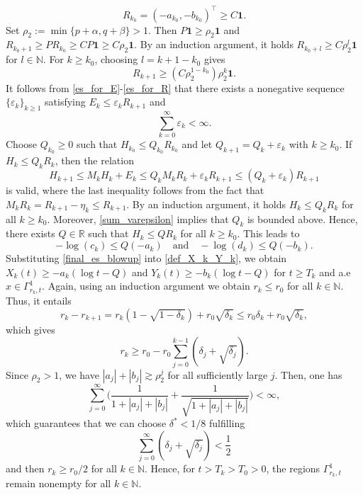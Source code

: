 \documentclass[11pt,reqno]{amsart}
\begin{document}
	\[
	R_{k_0}=(-a_{k_0},-b_{k_0})^{\top}\geq C\boldsymbol{1}.
	\]
	Set $\rho_2:= \min\{p+\alpha,q+\beta\}>1$. Then $P\boldsymbol{1}\geq \rho_2\boldsymbol{1}$ and $R_{k_0+1}\geq PR_{k_0}\geq CP\boldsymbol{1}\geq C\rho_2\boldsymbol{1}$. By an induction argument, it holds $R_{k_0+l}\geq C\rho^l_2\boldsymbol{1}$ for $l\in\mathbb{N}$. For $k\geq k_0$, choosing $l=k+1-k_0$ gives
	\begin{equation}\label{es_for_R}
		R_{k+1}\geq (C\rho^{1-k_0}_2)\rho^k_2\boldsymbol{1}.
	\end{equation}
	It follows from \eqref{es_for_E}-\eqref{es_for_R} that there exists a nonegative sequence $\{\varepsilon_k\}_{k\geq1}$ satisfying $E_k\leq\varepsilon_kR_{k+1}$ and
	\begin{equation}\label{sum_varepsilon}
		\sum_{k=0}^{\infty}\varepsilon_{k}<\infty.
	\end{equation}
	Choose $Q_{k_0}\geq0$ such that $H_{k_0}\leq Q_{k_0}R_{k_0}$ and let $Q_{k+1}=Q_{k}+\varepsilon_k$ with $k\geq k_0$. If $H_{k}\leq Q_{k} R_{k}$, then the relation
	\[
	H_{k+1}\leq M_{k}H_{k}+E_{k}\leq Q_kM_kR_k+\varepsilon_kR_{k+1}\leq (Q_{k}+\varepsilon_k)R_{k+1}
	\]
	is valid, where the last inequality follows from the fact that $M_{k}R_{k}=R_{k+1}-\eta_{k}\leq R_{k+1}$. By an induction argument, it holds $H_k\leq Q_kR_k$ for all $k\geq k_0$. Moreover, \eqref{sum_varepsilon} implies that $Q_k$ is bounded above. Hence, there exists $Q\in \mathbb{R}$ such that $H_k\leq QR_k$ for all $k\geq k_0$. This leads to
	\begin{equation}\label{final_es_blowup}
		-\log(c_k)\leq Q(-a_k)\quad\text{and}\quad-\log(d_k)\leq Q(-b_k).
	\end{equation}
	Substituting \eqref{final_es_blowup} into \eqref{def_X_k_Y_k}, we obtain $X_k(t)\geq-a_k(\log t-Q)$ and $Y_k(t)\geq-b_k(\log t-Q)$ for $t\geq T_k$ and a.e $x\in\Gamma^1_{r_k,t}$. Again, using an induction argument we obtain $r_k\leq r_0$ for all $k\in\mathbb{N}$. Thus, it entails
	\[
	r_k-r_{k+1}=r_k(1-\sqrt{1-\delta_k})+r_0\sqrt{\delta_k}\leq r_0\delta_k+r_0\sqrt{\delta_k},
	\]
	which gives
	\[
	r_k\geq r_0-r_0\sum_{j=0}^{k-1}(\delta_j+\sqrt{\delta_j}).
	\]
	Since $\rho_2>1$, we have $|a_j|+|b_j|\gtrsim \rho_2^j$ for all sufficiently large $j$. Then, one has
	\[
	\sum_{j=0}^{\infty}\bigg(\frac{1}{1+|a_j|+|b_j|}+\frac{1}{\sqrt{1+|a_j|+|b_j|}}\bigg)<\infty,
	\]
	which guarantees that we can choose $\delta^*<1/8$ fulfilling
	\[
	\sum_{j=0}^{\infty}(\delta_j+\sqrt{\delta_j})<\frac{1}{2}
	\]
	and then $r_k\geq r_0/2$ for all $k\in\mathbb{N}$. Hence, for $t>T_k>T_0>0$, the regions $\Gamma^1_{r_k,t}$ remain nonempty for all $k\in \mathbb{N}$.
	
\end{document}
